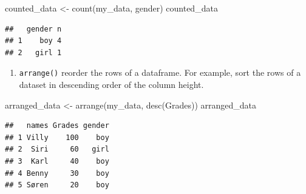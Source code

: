 \documentclass[
]{book}
\newenvironment{Shaded}{\begin{snugshade}}{\end{snugshade}}
\newcommand{\FunctionTok}[1]{\textcolor[rgb]{0.00,0.00,0.00}{#1}}
\newcommand{\NormalTok}[1]{#1}
\newcommand{\OtherTok}[1]{\textcolor[rgb]{0.56,0.35,0.01}{#1}}
\providecommand{\tightlist}{%
  \setlength{\itemsep}{0pt}\setlength{\parskip}{0pt}}
\begin{document}
\begin{Shaded}
\begin{Highlighting}[]
\NormalTok{  counted\_data }\OtherTok{\textless{}{-}} \FunctionTok{count}\NormalTok{(my\_data, gender)}
\NormalTok{  counted\_data}
\end{Highlighting}
\end{Shaded}

\begin{verbatim}
##   gender n
## 1    boy 4
## 2   girl 1
\end{verbatim}

\begin{enumerate}
\def\labelenumi{\arabic{enumi}.}
\tightlist
\item
  \texttt{arrange()} reorder the rows of a dataframe. For example, sort
  the rows of a dataset in descending order of the column height.
\end{enumerate}

\begin{Shaded}
\begin{Highlighting}[]
\NormalTok{arranged\_data }\OtherTok{\textless{}{-}} \FunctionTok{arrange}\NormalTok{(my\_data, }\FunctionTok{desc}\NormalTok{(Grades))}
\NormalTok{arranged\_data}
\end{Highlighting}
\end{Shaded}

\begin{verbatim}
##   names Grades gender
## 1 Villy    100    boy
## 2  Siri     60   girl
## 3  Karl     40    boy
## 4 Benny     30    boy
## 5 Søren     20    boy
\end{verbatim}
\end{document}
